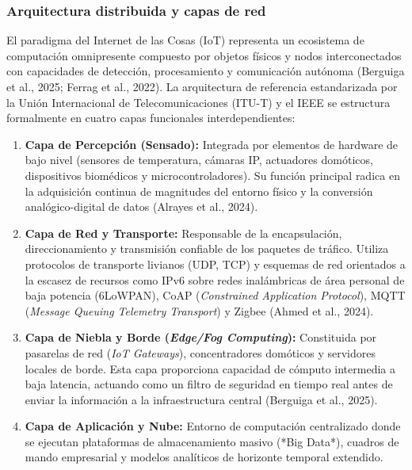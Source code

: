 \subsubsection{Arquitectura distribuida y capas de red}
El paradigma del Internet de las Cosas (IoT) representa un ecosistema de computación omnipresente compuesto por objetos físicos y nodos interconectados con capacidades de detección, procesamiento y comunicación autónoma (Berguiga et al., 2025; Ferrag et al., 2022). La arquitectura de referencia estandarizada por la Unión Internacional de Telecomunicaciones (ITU-T) y el IEEE se estructura formalmente en cuatro capas funcionales interdependientes:
\begin{enumerate}
    \item \textbf{Capa de Percepción (Sensado):} Integrada por elementos de hardware de bajo nivel (sensores de temperatura, cámaras IP, actuadores domóticos, dispositivos biomédicos y microcontroladores). Su función principal radica en la adquisición continua de magnitudes del entorno físico y la conversión analógico-digital de datos (Alrayes et al., 2024).
    \item \textbf{Capa de Red y Transporte:} Responsable de la encapsulación, direccionamiento y transmisión confiable de los paquetes de tráfico. Utiliza protocolos de transporte livianos (UDP, TCP) y esquemas de red orientados a la escasez de recursos como IPv6 sobre redes inalámbricas de área personal de baja potencia (6LoWPAN), CoAP (\textit{Constrained Application Protocol}), MQTT (\textit{Message Queuing Telemetry Transport}) y Zigbee (Ahmed et al., 2024).
    \item \textbf{Capa de Niebla y Borde (\textit{Edge/Fog Computing}):} Constituida por pasarelas de red (\textit{IoT Gateways}), concentradores domóticos y servidores locales de borde. Esta capa proporciona capacidad de cómputo intermedia a baja latencia, actuando como un filtro de seguridad en tiempo real antes de enviar la información a la infraestructura central (Berguiga et al., 2025).
    \item \textbf{Capa de Aplicación y Nube:} Entorno de computación centralizado donde se ejecutan plataformas de almacenamiento masivo (*Big Data*), cuadros de mando empresarial y modelos analíticos de horizonte temporal extendido.
\end{enumerate}


